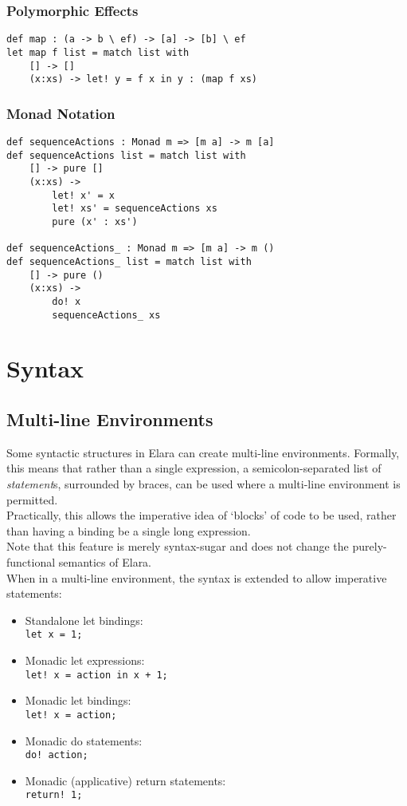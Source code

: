 \documentclass{article}
\begin{document}
\subsubsection{Polymorphic Effects}
\begin{verbatim}
def map : (a -> b \ ef) -> [a] -> [b] \ ef
let map f list = match list with
    [] -> []
    (x:xs) -> let! y = f x in y : (map f xs)
\end{verbatim}

\subsubsection{Monad Notation}
\begin{verbatim}
def sequenceActions : Monad m => [m a] -> m [a]
def sequenceActions list = match list with
    [] -> pure []
    (x:xs) ->
        let! x' = x
        let! xs' = sequenceActions xs
        pure (x' : xs')

def sequenceActions_ : Monad m => [m a] -> m ()
def sequenceActions_ list = match list with
    [] -> pure ()
    (x:xs) ->
        do! x
        sequenceActions_ xs
\end{verbatim}


\section{Syntax}
\subsection{Multi-line Environments}
\label{sec:multi-line-environments}
Some syntactic structures in Elara can create multi-line environments. Formally, this means that rather than a single expression, a semicolon-separated list of \emph{statement}s, surrounded by braces, can be used where a multi-line environment is permitted. \\
Practically, this allows the imperative idea of `blocks' of code to be used, rather than having a binding be a single long expression.\\
Note that this feature is merely syntax-sugar and does not change the purely-functional semantics of Elara.\\
When in a multi-line environment, the syntax is extended to allow imperative statements:
\begin{itemize}
    \item{Standalone let bindings: \\\verb|let x = 1;|}
    \item{Monadic let expressions: \\\verb|let! x = action in x + 1;|}
    \item{Monadic let bindings: \\\verb|let! x = action;|}
    \item{Monadic do statements: \\\verb|do! action;|}
    \item{Monadic (applicative) return statements: \\\verb|return! 1;|}
\end{itemize}
\end{document}

